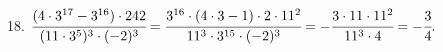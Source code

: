 18. $\cfrac{(4\cdot3^{17}-3^{16})\cdot242}{(11\cdot 3^5)^3\cdot(-2)^3}=\cfrac{3^{16}\cdot(4\cdot3-1)\cdot2\cdot11^2}{11^3\cdot 3^{15}\cdot(-2)^3}=
-\cfrac{3\cdot11\cdot11^2}{11^3\cdot4}=-\cfrac{3}{4}.$\\
